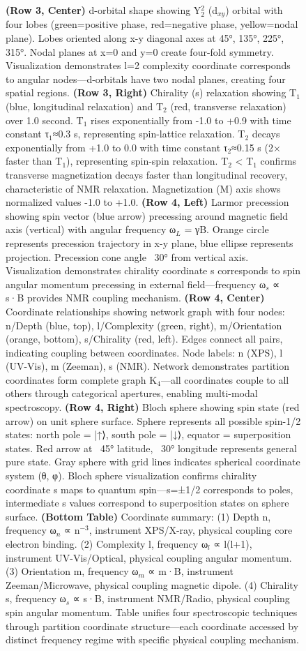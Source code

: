 \begin{figure}[htbp]
{    \textbf{(Row 3, Center)} d-orbital shape showing Y$_2^2$ (d$_{xy}$) orbital with four lobes (green=positive phase, red=negative phase, yellow=nodal plane). Lobes oriented along x-y diagonal axes at 45°, 135°, 225°, 315°. Nodal planes at x=0 and y=0 create four-fold symmetry. Visualization demonstrates l=2 complexity coordinate corresponds to angular nodes—d-orbitals have two nodal planes, creating four spatial regions. 
    \textbf{(Row 3, Right)} Chirality (s) relaxation showing T$_1$ (blue, longitudinal relaxation) and T$_2$ (red, transverse relaxation) over 1.0 second. T$_1$ rises exponentially from -1.0 to +0.9 with time constant τ$_1$≈0.3 s, representing spin-lattice relaxation. T$_2$ decays exponentially from +1.0 to 0.0 with time constant τ$_2$≈0.15 s (2× faster than T$_1$), representing spin-spin relaxation. T$_2$ < T$_1$ confirms transverse magnetization decays faster than longitudinal recovery, characteristic of NMR relaxation. Magnetization (M) axis shows normalized values -1.0 to +1.0. 
    \textbf{(Row 4, Left)} Larmor precession showing spin vector (blue arrow) precessing around magnetic field axis (vertical) with angular frequency ω$_L$ = γB. Orange circle represents precession trajectory in x-y plane, blue ellipse represents projection. Precession cone angle ~30° from vertical axis. Visualization demonstrates chirality coordinate s corresponds to spin angular momentum precessing in external field—frequency ω$_s$ ∝ s·B provides NMR coupling mechanism. 
    \textbf{(Row 4, Center)} Coordinate relationships showing network graph with four nodes: n/Depth (blue, top), l/Complexity (green, right), m/Orientation (orange, bottom), s/Chirality (red, left). Edges connect all pairs, indicating coupling between coordinates. Node labels: n (XPS), l (UV-Vis), m (Zeeman), s (NMR). Network demonstrates partition coordinates form complete graph K$_4$—all coordinates couple to all others through categorical apertures, enabling multi-modal spectroscopy. 
    \textbf{(Row 4, Right)} Bloch sphere showing spin state (red arrow) on unit sphere surface. Sphere represents all possible spin-1/2 states: north pole = |↑⟩, south pole = |↓⟩, equator = superposition states. Red arrow at ~45° latitude, ~30° longitude represents general pure state. Gray sphere with grid lines indicates spherical coordinate system (θ, φ). Bloch sphere visualization confirms chirality coordinate s maps to quantum spin—s=±1/2 corresponds to poles, intermediate s values correspond to superposition states on sphere surface. 
    \textbf{(Bottom Table)} Coordinate summary: (1) Depth n, frequency ω$_n$ ∝ n$^{-3}$, instrument XPS/X-ray, physical coupling core electron binding. (2) Complexity l, frequency ω$_l$ ∝ l(l+1), instrument UV-Vis/Optical, physical coupling angular momentum. (3) Orientation m, frequency ω$_m$ ∝ m·B, instrument Zeeman/Microwave, physical coupling magnetic dipole. (4) Chirality s, frequency ω$_s$ ∝ s·B, instrument NMR/Radio, physical coupling spin angular momentum. Table unifies four spectroscopic techniques through partition coordinate structure—each coordinate accessed by distinct frequency regime with specific physical coupling mechanism.}
    \label{fig:unified_spectroscopy}
\end{figure}

